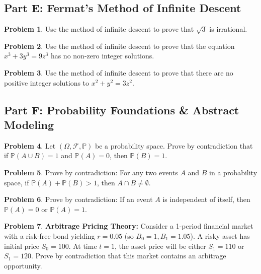 \documentclass[11pt]{article}
\theoremstyle{definition}
\newtheorem{problem}{Problem}
\begin{document}
\subsection{Part E: Fermat's Method of Infinite Descent}

\begin{problem}
Use the method of infinite descent to prove that $\sqrt{3}$ is irrational.
\end{problem}

\begin{problem}
Use the method of infinite descent to prove that the equation $x^3 + 3y^3 = 9z^3$ has no non-zero integer solutions.
\end{problem}

\begin{problem}
Use the method of infinite descent to prove that there are no positive integer solutions to $x^2 + y^2 = 3z^2$.
\end{problem}

\subsection{Part F: Probability Foundations \& Abstract Modeling}

\begin{problem}
Let $(\Omega, \mathcal{F}, \mathbb{P})$ be a probability space. Prove by contradiction that if $\mathbb{P}(A \cup B) = 1$ and $\mathbb{P}(A) = 0$, then $\mathbb{P}(B) = 1$.
\end{problem}

\begin{problem}
Prove by contradiction: For any two events $A$ and $B$ in a probability space, if $\mathbb{P}(A) + \mathbb{P}(B) > 1$, then $A \cap B \neq \emptyset$.
\end{problem}

\begin{problem}
Prove by contradiction: If an event $A$ is independent of itself, then $\mathbb{P}(A) = 0$ or $\mathbb{P}(A) = 1$.
\end{problem}

\begin{problem}
\textbf{Arbitrage Pricing Theory:} Consider a 1-period financial market with a risk-free bond yielding $r = 0.05$ (so $B_0 = 1, B_1 = 1.05$). A risky asset has initial price $S_0 = 100$. At time $t=1$, the asset price will be either $S_1 = 110$ or $S_1 = 120$. Prove by contradiction that this market contains an arbitrage opportunity.
\end{problem}
\end{document}

